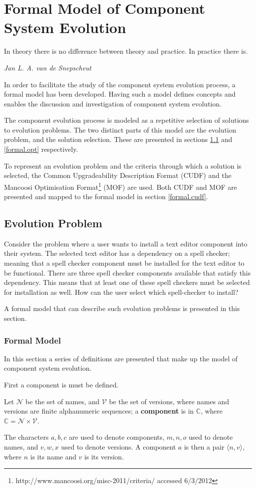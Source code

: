 \chapter{Formal Model of Component System Evolution}
\label{formal}
\epigraph{In theory there is no difference between theory and practice. In practice there is.}
{\textit{Jan L. A. van de Snepscheut}}
In order to facilitate the study of the component system evolution process, a formal model has been developed.
Having such a model defines concepts and enables the discussion and investigation of component system evolution.

The component evolution process is modeled as a repetitive selection of solutions to evolution problems.
The two distinct parts of this model are the evolution problem, and the solution selection.
These are presented in sections \ref{formal.step} and \ref{formal.opt} respectively.

To represent an evolution problem and the criteria through which a solution is selected,
the Common Upgradeability Description Format (CUDF) \citep{treinen2009common}
and the Mancoosi Optimisation Format\footnote{http://www.mancoosi.org/misc-2011/criteria/ accessed 6/3/2012} (MOF) are used.
Both CUDF and MOF are presented and mapped to the formal model in section \ref{formal.cudf}. 

\section{Evolution Problem}
\label{formal.step}
Consider the problem where a user wants to install a text editor component into their system.
The selected text editor has a dependency on a spell checker;
meaning that a spell checker component must be installed for the text editor to be functional.
There are three spell checker components available that satisfy this dependency.
This means that at least one of these spell checkers must be selected for installation as well.
How can the user select which spell-checker to install? 

A formal model that can describe such evolution problems is presented in this section.

\subsection{Formal Model}
In this section a series of definitions are presented that make up the model of component system evolution.

First a component is must be defined.
\begin{defs}
\label{formal.componentdef}
Let $\mathcal{N}$ be the set of names, and $\mathcal{V}$ be the set of versions, where names and versions are finite alphanumeric sequences; 
a \textbf{component} is in $\mathbb{C}$, where $\mathbb{C} = \mathcal{N} \times \mathcal{V}$. 
\end{defs}
The characters  $a,b,c$ are used to denote components, $m,n,o$ used to denote names, and $v,w,x$ used to denote versions.
A component $a$ is then a pair $\langle n,v \rangle$, where $n$ is its name and $v$ is its version.

